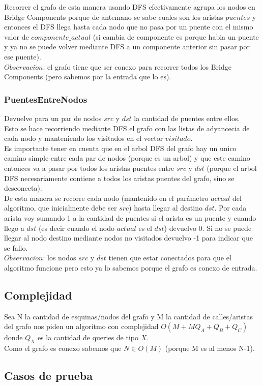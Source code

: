 Recorrer el grafo de esta manera usando DFS efectivamente agrupa los nodos en Bridge Components porque de antemano se sabe cuales son 
los aristas $puentes$ y entonces el DFS llega hasta cada nodo que no pasa por un puente con el mismo valor de $componente\_actual$ (si
cambia de componente es porque habia un puente y ya no se puede volver mediante DFS a un componente anterior sin pasar por ese puente). \\

$Observaci\acute{o}n$: el grafo tiene que ser conexo para recorrer todos los Bridge Components (pero sabemos por la entrada que lo es). \\

\subsubsection*{PuentesEntreNodos}

Devuelve para un par de nodos $src$ y $dst$ la cantidad de puentes entre ellos. \\

Esto se hace recorriendo mediante DFS el grafo con las listas de adyancecia de cada nodo y manteniendo los visitados en el vector
$visitado$. \\
Es importante tener en cuenta que en el arbol DFS del grafo hay un unico camino simple entre cada par de nodos (porque es un arbol)
y que este camino entonces va a pasar por todos los  aristas puentes entre $src$ y $dst$ (porque el arbol DFS necesariamente contiene
a todos los aristas puentes del grafo, sino se desconecta). \\
De esta manera se recorre cada nodo (mantenido en el parámetro $actual$ del algoritmo, que inicialmente debe ser $src$)
hasta llegar al destino $dst$. Por cada arista voy sumando 1 a la cantidad de puentes si el arista es un puente y cuando llego a $dst$ 
(es decir cuando el nodo $actual$ es el $dst$) devuelvo 0. Si no se puede llegar al nodo destino mediante nodos no visitados devuelvo -1
para indicar que se fallo. \\

$Observaci\acute{o}n$: los nodos $src$ y $dst$ tienen que estar conectados para que el algoritmo funcione pero esto ya lo sabemos
porque el grafo es conexo de entrada. \\

\subsection{Complejidad}

Sea N la cantidad de esquinas/nodos del grafo y M la cantidad de calles/aristas del grafo nos piden un algoritmo con complejidad
$O(M+MQ_A+Q_B+Q_C)$ donde $Q_X$ es la cantidad de queries de tipo $X$. \\
Como el grafo es conexo sabemos que $N \in O(M)$ (porque M es al menos N-1). \\

\subsection{Casos de prueba}
